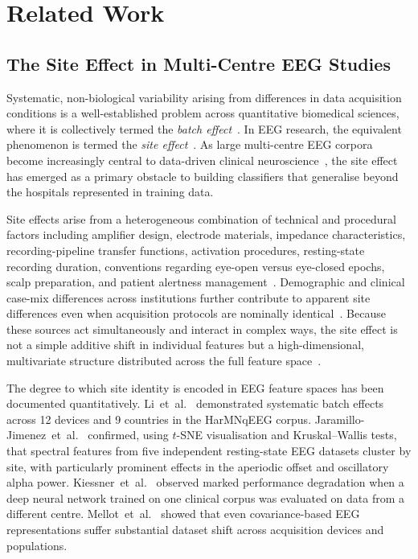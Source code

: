 \documentclass[preprint,12pt]{elsarticle}
\begin{document}
\section{Related Work}
\label{sec:related}

\subsection{The Site Effect in Multi-Centre EEG Studies}
\label{subsec:site_effect}

Systematic, non-biological variability arising from differences in
data acquisition conditions is a well-established problem across
quantitative biomedical sciences, where it is collectively termed the
\emph{batch effect}~\cite{johnson2007adjusting}.
In EEG research, the equivalent phenomenon is termed the \emph{site
effect}~\cite{li2022harmnqeeg}.
As large multi-centre EEG corpora become increasingly central to
data-driven clinical neuroscience~\cite{dong2025normative,
mushtaq2025eeg}, the site effect has emerged as a primary obstacle to
building classifiers that generalise beyond the hospitals represented
in training data.

Site effects arise from a heterogeneous combination of technical and
procedural factors including amplifier design, electrode materials,
impedance characteristics, recording-pipeline transfer functions,
activation procedures, resting-state recording duration, conventions
regarding eye-open versus eye-closed epochs, scalp preparation, and
patient alertness
management~\cite{jaramillo2024combat,mushtaq2025eeg}.
Demographic and clinical case-mix differences across institutions
further contribute to apparent site differences even when acquisition
protocols are nominally identical~\cite{dong2025normative}.
Because these sources act simultaneously and interact in complex ways,
the site effect is not a simple additive shift in individual features
but a high-dimensional, multivariate structure distributed across the
full feature space~\cite{mellot2023meeg}.

The degree to which site identity is encoded in EEG feature spaces
has been documented quantitatively.
Li~et~al.~\cite{li2022harmnqeeg} demonstrated systematic batch
effects across 12 devices and 9 countries in the HarMNqEEG corpus.
Jaramillo-Jimenez~et~al.~\cite{jaramillo2024combat} confirmed, using
$t$-SNE visualisation and Kruskal--Wallis tests, that spectral
features from five independent resting-state EEG datasets cluster by
site, with particularly prominent effects in the aperiodic offset and
oscillatory alpha power.
Kiessner~et~al.~\cite{kiessner2023extended} observed marked
performance degradation when a deep neural network trained on one
clinical corpus was evaluated on data from a different centre.
Mellot~et~al.~\cite{mellot2023meeg} showed that even
covariance-based EEG representations suffer substantial dataset shift
across acquisition devices and populations.
\end{document}
